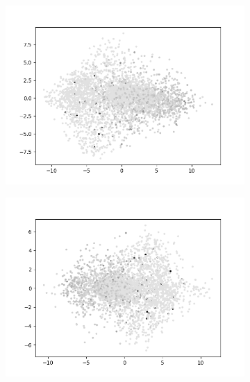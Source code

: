 \begin{figure}[H]
\begin{subfigure}{.25\textwidth}
        \includegraphics[width=\textwidth]{images/figures/experiments_latent/pooling_dim1024_PCA_dsm.png}
    \end{subfigure}%
    \begin{subfigure}{.25\textwidth}
        \centering
        \includegraphics[width=\textwidth]{images/figures/experiments_latent/pooling_dim50_PCA_dsm.png}
    \end{subfigure}
    \begin{subfigure}{.25\textwidth}
        \centering

\end{subfigure}
\end{figure}
